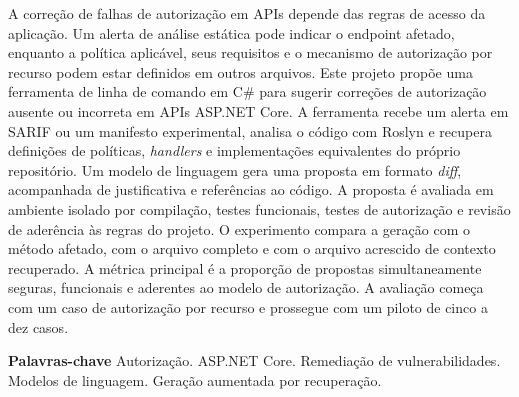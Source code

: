 
\hypersetup{pageanchor=false}
\imprimircapa
\hypersetup{pageanchor=true}

\begin{resumo}
A correção de falhas de autorização em APIs depende das regras de acesso da aplicação. Um alerta de análise estática pode indicar o endpoint afetado, enquanto a política aplicável, seus requisitos e o mecanismo de autorização por recurso podem estar definidos em outros arquivos. Este projeto propõe uma ferramenta de linha de comando em C\# para sugerir correções de autorização ausente ou incorreta em APIs ASP.NET Core. A ferramenta recebe um alerta em SARIF ou um manifesto experimental, analisa o código com Roslyn e recupera definições de políticas, \textit{handlers} e implementações equivalentes do próprio repositório. Um modelo de linguagem gera uma proposta em formato \textit{diff}, acompanhada de justificativa e referências ao código. A proposta é avaliada em ambiente isolado por compilação, testes funcionais, testes de autorização e revisão de aderência às regras do projeto. O experimento compara a geração com o método afetado, com o arquivo completo e com o arquivo acrescido de contexto recuperado. A métrica principal é a proporção de propostas simultaneamente seguras, funcionais e aderentes ao modelo de autorização. A avaliação começa com um caso de autorização por recurso e prossegue com um piloto de cinco a dez casos.

\textbf{Palavras-chave} \enspace Autorização. ASP.NET Core. Remediação de vulnerabilidades. Modelos de linguagem. Geração aumentada por recuperação.
\end{resumo}

\enlargethispage{2\baselineskip}
\tableofcontents*
\cleardoublepage
